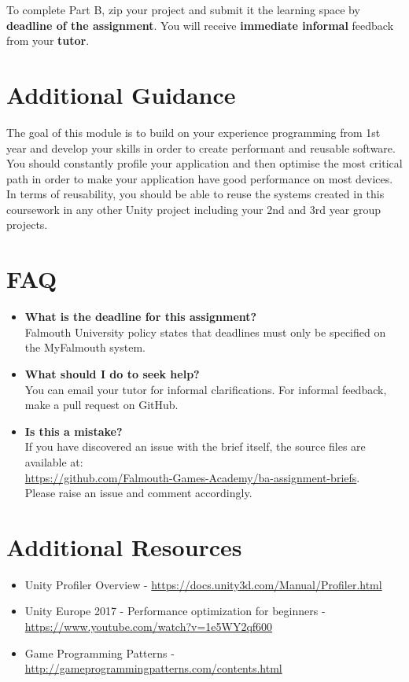 \documentclass{../../fal_assignment}
\begin{document}
To complete Part B, zip your project and submit it the learning space by \textbf{deadline of the assignment}. You will receive \textbf{immediate informal} feedback from your \textbf{tutor}.

\section*{Additional Guidance}
The goal of this module is to build on your experience programming from 1st year and develop your skills in order to create performant and reusable software. You should constantly profile your application and then optimise the most critical path in order to make your application have good performance on most devices. In terms of reusability, you should be able to reuse the systems created in this coursework in any other Unity project including your 2nd and 3rd year group projects.  

\section*{FAQ}

\begin{itemize}
	\item 	\textbf{What is the deadline for this assignment?} \\ 
    		Falmouth University policy states that deadlines must only be specified on the MyFalmouth system.
    		
	\item 	\textbf{What should I do to seek help?} \\ 
    		You can email your tutor for informal clarifications. For informal feedback, make a pull request on GitHub. 
    		
    	\item 	\textbf{Is this a mistake?} \\ 	
    		If you have discovered an issue with the brief itself, the source files are available at: \\
    		\url{https://github.com/Falmouth-Games-Academy/ba-assignment-briefs}.\\
    		 Please raise an issue and comment accordingly.
\end{itemize}

\section*{Additional Resources}

\begin{itemize}
     \item Unity Profiler Overview - \url{https://docs.unity3d.com/Manual/Profiler.html}
     \item Unity Europe 2017 - Performance optimization for beginners -  \url{https://www.youtube.com/watch?v=1e5WY2qf600}
     \item Game Programming Patterns - \url{http://gameprogrammingpatterns.com/contents.html}
\end{itemize}
\end{document}
